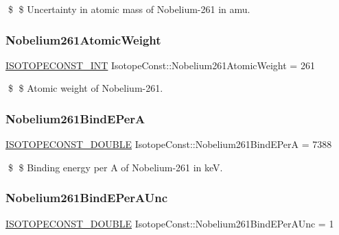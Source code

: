 \$ \$ Uncertainty in atomic mass of Nobelium-\/261 in amu. \mbox{\label{group___isotope_const-_nobelium-_no261_gaa670dc5466e54a914466bf486a0565a2}} 
\subsubsection{\texorpdfstring{Nobelium261\+Atomic\+Weight}{Nobelium261AtomicWeight}}
{\footnotesize\ttfamily \mbox{\hyperlink{group___isotope_const-_macros_ga5f18360b3e99483a35c32d789e62621c}{I\+S\+O\+T\+O\+P\+E\+C\+O\+N\+S\+T\+\_\+\+I\+NT}} Isotope\+Const\+::\+Nobelium261\+Atomic\+Weight = 261}

\$ \$ Atomic weight of Nobelium-\/261. \mbox{\label{group___isotope_const-_nobelium-_no261_ga737dec4c5c9ff41d0d828285603d837a}} 
\subsubsection{\texorpdfstring{Nobelium261\+Bind\+E\+PerA}{Nobelium261BindEPerA}}
{\footnotesize\ttfamily \mbox{\hyperlink{group___isotope_const-_macros_ga8f45a7272ce02c0b4c65c44636ed719a}{I\+S\+O\+T\+O\+P\+E\+C\+O\+N\+S\+T\+\_\+\+D\+O\+U\+B\+LE}} Isotope\+Const\+::\+Nobelium261\+Bind\+E\+PerA = 7388}

\$ \$ Binding energy per A of Nobelium-\/261 in keV. \mbox{\label{group___isotope_const-_nobelium-_no261_gabef066e6e11b1f71ec46f1d0ff65e29a}} 
\subsubsection{\texorpdfstring{Nobelium261\+Bind\+E\+Per\+A\+Unc}{Nobelium261BindEPerAUnc}}
{\footnotesize\ttfamily \mbox{\hyperlink{group___isotope_const-_macros_ga8f45a7272ce02c0b4c65c44636ed719a}{I\+S\+O\+T\+O\+P\+E\+C\+O\+N\+S\+T\+\_\+\+D\+O\+U\+B\+LE}} Isotope\+Const\+::\+Nobelium261\+Bind\+E\+Per\+A\+Unc = 1}

